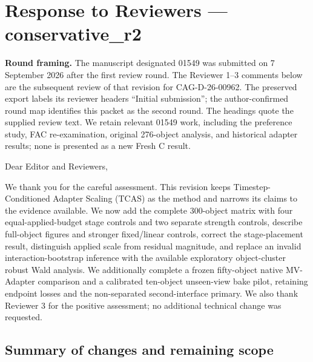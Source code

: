 \documentclass[
  10pt,
]{article}
\author{}
\date{}
\begin{document}
\hypertarget{response-to-reviewers-conservative_r2}{%
\section{Response to Reviewers ---
conservative\_r2}\label{response-to-reviewers-conservative_r2}}

\textbf{Round framing.} The manuscript designated 01549 was submitted on
7 September 2026 after the first review round. The Reviewer 1--3
comments below are the subsequent review of that revision for
CAG-D-26-00962. The preserved export labels its reviewer headers
``Initial submission''; the author-confirmed round map identifies this
packet as the second round. The headings quote the supplied review text.
We retain relevant 01549 work, including the preference study, FAC
re-examination, original 276-object analysis, and historical adapter
results; none is presented as a new Fresh C result.

Dear Editor and Reviewers,

We thank you for the careful assessment. This revision keeps
Timestep-Conditioned Adapter Scaling (TCAS) as the method and narrows
its claims to the evidence available. We now add the complete 300-object
matrix with four equal-applied-budget stage controls and two separate
strength controls, describe full-object figures and stronger
fixed/linear controls, correct the stage-placement result, distinguish
applied scale from residual magnitude, and replace an invalid
interaction-bootstrap inference with the available exploratory
object-cluster robust Wald analysis. We additionally complete a frozen
fifty-object native MV-Adapter comparison and a calibrated ten-object
unseen-view bake pilot, retaining endpoint losses and the non-separated
second-interface primary. We also thank Reviewer 3 for the positive
assessment; no additional technical change was requested.

\hypertarget{summary-of-changes-and-remaining-scope}{%
\subsection{Summary of changes and remaining
scope}\label{summary-of-changes-and-remaining-scope}}
\end{document}
